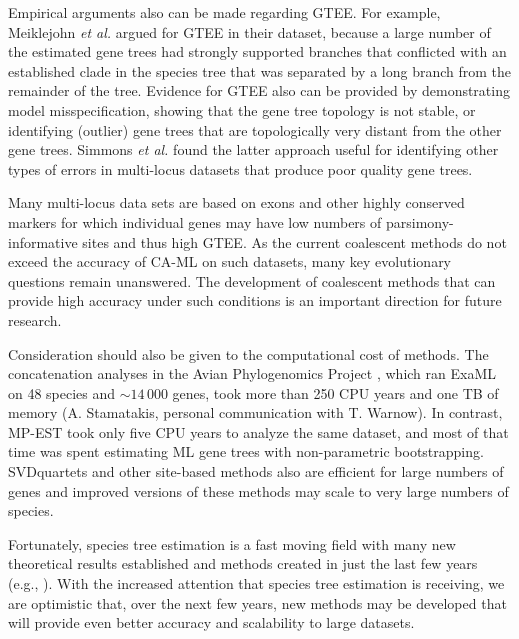 Empirical arguments also can be made regarding GTEE. 
For example, Meiklejohn {\em et al.} \cite{meiklejohn2016analysis} argued for GTEE in their dataset, because a large number of the estimated gene trees had strongly supported branches that conflicted with an established clade in the species tree that was separated by a long branch from the remainder of the tree. 
Evidence for GTEE also can be provided by demonstrating model misspecification, showing that the gene tree topology is not stable, or identifying (outlier) gene trees that are topologically very distant from the other gene trees. 
Simmons {\em et al.} \cite{simmons2016effects} found the latter approach useful for identifying other types of errors in multi-locus datasets that produce poor quality gene trees.

Many multi-locus data sets are based on exons and other highly conserved markers for which individual genes may have low numbers of parsimony-informative sites and thus high GTEE.
As the current coalescent methods do not exceed the accuracy of CA-ML on such datasets, many key evolutionary questions remain unanswered.
The development of coalescent methods that can provide high accuracy under such conditions is an important direction for future research.

Consideration should also be given to the computational cost of methods.
The concatenation analyses in the Avian Phylogenomics Project \cite{jarvis2014whole}, which ran \gls{ExaML} on 48 species and $\sim$$14\,000$ genes, took more than 250 CPU years and one TB of memory (A. Stamatakis, personal communication with T. Warnow).
In contrast, MP-EST took only five CPU years to analyze the same dataset, and most of that time was spent estimating ML gene trees with non-parametric bootstrapping. 
SVDquartets and other site-based methods also are efficient for large numbers of genes and improved versions of these methods may scale to very large numbers of species.

Fortunately, species tree estimation is a fast moving field with many new theoretical results established and methods created in just the last few years (e.g., \cite{boussau2013genome-phyldog, roch2013recovering, yu2014maximum, solis2016inferring, solis2016inconsistency, wen2016bayesian, zhu2017bayesian, dasarathy2017coalescent, shekhar2018species}). 
With the increased attention that species tree estimation is receiving, we are optimistic that, over the next few years, new methods may be developed that will provide even better accuracy and scalability to large datasets.


